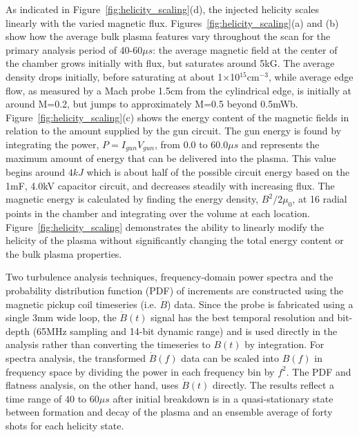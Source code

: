 \documentclass[aps,prl,amsmath,amssymb,reprint,superscriptaddress]{revtex4-1} %
\begin{document}

As indicated in Figure~\ref{fig:helicity_scaling}(d), the injected helicity scales linearly with the varied magnetic flux. Figures~\ref{fig:helicity_scaling}(a) and (b) show how the average bulk plasma features vary throughout the scan for the primary analysis period of 40-60$\mu s$: the average magnetic field at the center of the chamber grows initially with flux, but saturates around 5kG. The average density drops initially, before saturating at about 1$\times$10$^{15}$cm$^{-3}$, while average edge flow, as measured by a Mach probe 1.5cm from the cylindrical edge, is initially at around M=0.2, but jumps to approximately M=0.5 beyond 0.5mWb. Figure~\ref{fig:helicity_scaling}(c) shows the energy content of the magnetic fields in relation to the amount supplied by the gun circuit. The gun energy is found by integrating the power, $P = I_{gun}V_{gun}$, from 0.0 to 60.0$\mu s$ and represents the maximum amount of energy that can be delivered into the plasma. This value begins around $4kJ$ which is about half of the possible circuit energy based on the 1mF, 4.0kV capacitor circuit, and decreases steadily with increasing flux. The magnetic energy is calculated by finding the energy density, $B^{2}/2\mu_{0}$, at 16 radial points in the chamber and integrating over the volume at each location. Figure~\ref{fig:helicity_scaling} demonstrates the ability to linearly modify the helicity of the plasma without significantly changing the total energy content or the bulk plasma properties.

Two turbulence analysis techniques, frequency-domain power spectra and the probability distribution function (PDF) of increments are constructed using the magnetic pickup coil timeseries (i.e. $\dot{B}$) data. Since the probe is fabricated using a single 3mm wide loop, the $\dot{B}(t)$ signal has the best temporal resolution and bit-depth (65MHz sampling and 14-bit dynamic range) and is used directly in the analysis rather than converting the timeseries to $B(t)$ by integration. For spectra analysis, the transformed $\dot{B}(f)$ data can be scaled into $B(f)$ in frequency space by dividing the power in each frequency bin by $f^{2}$. The PDF and flatness analysis, on the other hand, uses $\dot{B}(t)$ directly. The results reflect a time range of $40$ to $60 \mu s$ after initial breakdown is in a quasi-stationary state between formation and decay of the plasma and an ensemble average of forty shots for each helicity state.
\end{document}
